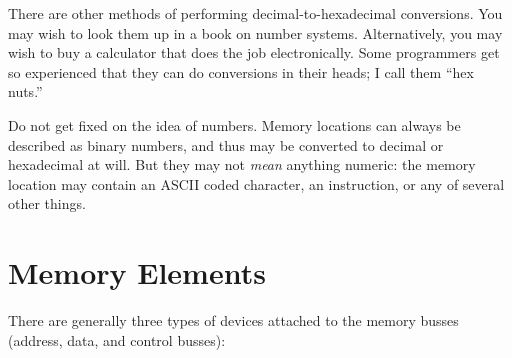 \documentclass[11pt,a4paper,titlepage]{memoir}
\begin{document}
There are other methods of performing decimal-to-hexadecimal conversions. You may wish to look them up in a book on number systems. Alternatively, you may wish to buy a calculator that does the job electronically. Some programmers get so experienced that they can do conversions in their heads; I call them ``hex nuts.''

Do not get fixed on the idea of numbers. Memory locations can always
be described as binary numbers, and thus may be converted to decimal
or hexadecimal at will. But they may not \emph{mean} anything numeric: the
memory location may contain an ASCII coded character, an instruction,
or any of several other things.
\section{Memory Elements}
There are generally three types of devices attached to the memory busses
(address, data, and control busses):
\end{document}
